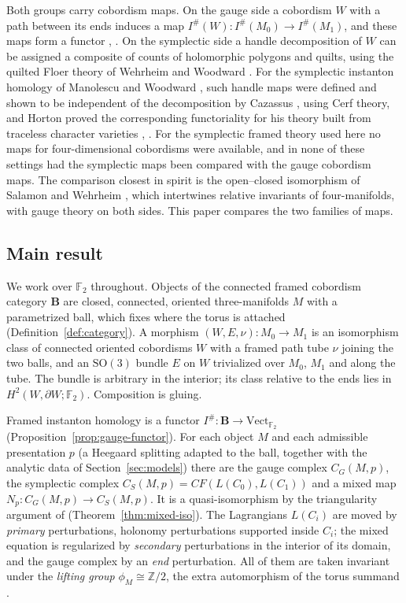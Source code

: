 \documentclass[11pt]{amsart}
\theoremstyle{definition}
\theoremstyle{remark}
\theoremstyle{plain}
\numberwithin{equation}{section}
\newcommand{\ZZ}{\mathbb{Z}}
\newcommand{\FF}{\mathbb{F}_2}
\newcommand{\bB}{\mathbf{B}}
\newcommand{\SO}{\mathrm{SO}}
\newcommand{\Ish}{I^{\#}}
\newcommand{\CF}{\mathit{CF}}
\begin{document}
Both groups carry cobordism maps. On the gauge side a cobordism $W$ with
a path between its ends induces a map
$\Ish(W)\colon\Ish(M_0)\to\Ish(M_1)$, and these maps form a functor
\cite[Section~5]{KM-unknot}, \cite[Section~7]{Scaduto}. On the
symplectic side a handle decomposition of $W$ can be assigned a composite of
counts of holomorphic polygons and quilts, using the quilted Floer theory of
Wehrheim and Woodward \cite{WW-quilt, WW-composition}. For the symplectic instanton
homology of Manolescu and Woodward \cite{MW}, such handle maps were defined and
shown to be independent of the decomposition by Cazassus \cite{Caz-nat}, using
Cerf theory, and Horton proved the corresponding functoriality for his
theory built from traceless character varieties \cite{Hor1},
\cite[Theorems~1.1--1.2]{Hor2}. For the
symplectic framed theory used here no maps for four-dimensional cobordisms were available, and in
none of these settings had the symplectic maps been compared with the gauge
cobordism maps. The comparison closest in spirit is the open--closed
isomorphism of Salamon and Wehrheim \cite[Theorem~5.8]{SW-openclosed}, which intertwines
relative invariants of four-manifolds, with gauge theory on both sides. This
paper compares the two families of maps.

\subsection{Main result}

We work over $\FF$ throughout. Objects of the connected framed
cobordism category $\bB$ are closed, connected, oriented three-manifolds
$M$ with a parametrized ball, which fixes where the torus is attached
(Definition~\ref{def:category}). A morphism $(W,E,\nu)\colon M_0\to
M_1$ is an isomorphism class of connected oriented cobordisms $W$ with a
framed path tube $\nu$ joining the two balls, and an $\SO(3)$ bundle $E$
on $W$ trivialized over $M_0$, $M_1$ and along the tube. The bundle is
arbitrary in the interior; its class relative to the ends lies in
$H^2(W,\partial W;\FF)$. Composition is gluing.

Framed instanton homology is a functor
$\Ish\colon\bB\to\mathrm{Vect}_{\FF}$
(Proposition~\ref{prop:gauge-functor}). For each object $M$ and each
admissible presentation $p$ (a Heegaard splitting adapted to the ball,
together with the analytic data of Section~\ref{sec:models}) there are
the gauge complex $C_G(M,p)$, the symplectic complex
$C_S(M,p)=\CF(L(C_0),L(C_1))$ and a mixed map
$N_p\colon C_G(M,p)\to C_S(M,p)$. It is a quasi-isomorphism by the
triangularity argument of \cite[Theorem~3.29]{DFL}
(Theorem~\ref{thm:mixed-iso}). The Lagrangians $L(C_i)$ are moved by \emph{primary}
perturbations, holonomy perturbations supported inside $C_i$; the mixed equation is
regularized by \emph{secondary} perturbations in the interior of its domain, and the gauge
complex by an \emph{end} perturbation. All of them are taken invariant under the
\emph{lifting group} $\phi_M\cong\ZZ/2$, the extra automorphism of the torus summand
\cite[Section~5.1]{KM-unknot}.
\end{document}
